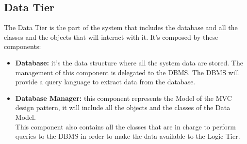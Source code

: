 \documentclass[../../../../../../dd.tex]{subfiles}
\begin{document}
	\subsection{Data Tier}
		The Data Tier is the part of the system that includes the database and all the classes and the objects that will interact with it.
		It's composed by these components:
		\begin{itemize}
			\item \textbf{Database:} it's the data structure where all the system data are stored. The management of this component is delegated to the DBMS. The DBMS will provide a query language to extract data from the database.
			\item \textbf{Database Manager:} this component represents the Model of the MVC design pattern, it will include all the objects and the classes of the Data Model.\\ This component also contains all the classes that are in charge to perform queries to the DBMS in order to make the data available to the Logic Tier.
		\end{itemize}
	
\end{document}
